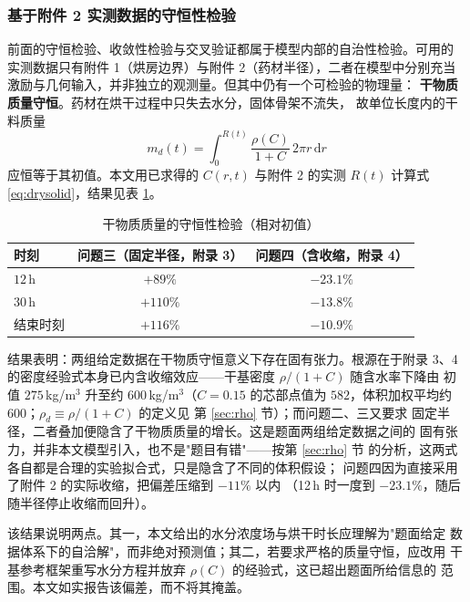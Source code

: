 \documentclass[12pt,a4paper,fontset=none]{ctexart}
\begin{document}
\subsubsection{基于附件 2 实测数据的守恒性检验}
\label{sec:drymass}

前面的守恒检验、收敛性检验与交叉验证都属于模型内部的自治性检验。可用的
实测数据只有附件 1（烘房边界）与附件 2（药材半径），二者在模型中分别充当
激励与几何输入，并非独立的观测量。但其中仍有一个可检验的物理量：
\textbf{干物质质量守恒}。药材在烘干过程中只失去水分，固体骨架不流失，
故单位长度内的干料质量
\begin{equation}
  m_d(t)=\int_0^{R(t)}\frac{\rho\!\left(C\right)}{1+C}\,2\pi r\,\mathrm{d}r
  \label{eq:drysolid}
\end{equation}
应恒等于其初值。本文用已求得的 $C(r,t)$ 与附件 2 的实测 $R(t)$ 计算式
\eqref{eq:drysolid}，结果见表 \ref{tab:drymass}。

\begin{table}[htbp]
  \centering
  \caption{干物质质量的守恒性检验（相对初值）}
  \label{tab:drymass}
  \small
  \begin{tabular}{lcc}
    \toprule
    时刻 & 问题三（固定半径，附录 3） & 问题四（含收缩，附录 4） \\
    \midrule
    $12$\,h       & $+89\%$ & $-23.1\%$ \\
    $30$\,h       & $+110\%$ & $-13.8\%$ \\
    结束时刻       & $+116\%$ & $-10.9\%$ \\
    \bottomrule
  \end{tabular}
\end{table}

结果表明：两组给定数据在干物质守恒意义下存在固有张力。根源在于附录 3、4
的密度经验式本身已内含收缩效应——干基密度 $\rho/(1+C)$ 随含水率下降由
初值 $275$\,kg/m$^3$ 升至约 $600$\,kg/m$^3$（$C=0.15$ 的芯部点值为
$582$，体积加权平均约 $600$；$\rho_d\equiv\rho/(1+C)$ 的定义见
第 \ref{sec:rho} 节）；而问题二、三又要求
固定半径，二者叠加便隐含了干物质质量的增长。这是题面两组给定数据之间的
固有张力，并非本文模型引入，也不是"题目有错"——按第 \ref{sec:rho} 节
的分析，这两式各自都是合理的实验拟合式，只是隐含了不同的体积假设；
问题四因为直接采用了附件 2 的实际收缩，把偏差压缩到 $-11\%$ 以内
（12\,h 时一度到 $-23.1\%$，随后随半径停止收缩而回升）。

该结果说明两点。其一，本文给出的水分浓度场与烘干时长应理解为"题面给定
数据体系下的自洽解"，而非绝对预测值；其二，若要求严格的质量守恒，应改用
干基参考框架重写水分方程并放弃 $\rho(C)$ 的经验式，这已超出题面所给信息的
范围。本文如实报告该偏差，而不将其掩盖。
\end{document}

